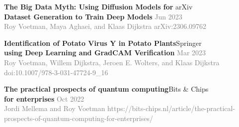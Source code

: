 \documentclass[a4paper]{article}
\newcommand{\lineunder} {
    \vspace*{-8pt} \\
    \hspace*{-18pt} \hrulefill \\
}
\newcommand{\header} [1] {
    {\hspace*{-18pt}\vspace*{6pt} \textsc{#1}}
    \vspace*{-6pt} \lineunder
}
\begin{document}
\textbf{The Big Data Myth: Using Diffusion Models for }\hfill arXiv\\
\small{\textbf{Dataset Generation to Train Deep Models} \hfill \textcolor{gray}{Jun 2023}}\\
\footnotesize{\textcolor{gray}{Roy Voetman, Maya Aghaei, and Klaas Dijkstra \hfill
 	arXiv:2306.09762}}\\
\normalsize
\vspace{2mm}

\textbf{Identification of Potato Virus Y in Potato Plants}\hfill Springer\\
\small{\textbf{using Deep Learning and GradCAM Verification} \hfill \textcolor{gray}{Mar 2023}}\\
\footnotesize{\textcolor{gray}{Roy Voetman, Willem Dijkstra, Jeroen E. Wolters, and Klaas Dijkstra \hfill
 	doi:10.1007/978-3-031-47724-9\_16}}\\
\normalsize
\vspace{2mm}

\textbf{The practical prospects of quantum computing}\hfill Bits \& Chips\\
\small{\textbf{for enterprises} \hfill \textcolor{gray}{Oct 2022}}\\
\footnotesize{\textcolor{gray}{Jordi Mellema and Roy Voetman} \hfill
\textcolor{gray}{https://bits-chips.nl/article/the-practical-prospects-of-quantum-computing-for-enterprises/}}\\
\normalsize
\vspace{2mm}


%

\ 
\end{document}

